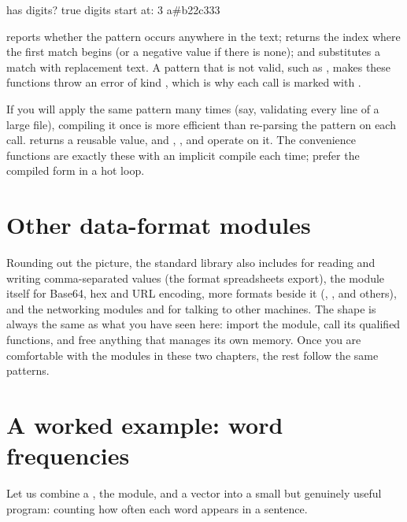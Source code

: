 \begin{progout}
has digits? true
digits start at: 3
a#b22c333
\end{progout}

 reports whether the pattern occurs anywhere in
the text;  returns the index where the first match begins (or a
negative value if there is none); and  substitutes a match
with replacement text. A pattern that is not valid, such as \code{"[0-9"}, makes
these functions throw an error of kind , which is why each call is
marked with .

\begin{deep}
If you will apply the same pattern many times (say, validating every line of a
large file), compiling it once is more efficient than re-parsing the pattern on
each call.  returns a reusable  value, and
, , and
 operate on it. The  convenience
functions are exactly these with an implicit compile each time; prefer the
compiled form in a hot loop.
\end{deep}

\section{Other data-format modules}

Rounding out the picture, the standard library also includes 
for reading and writing comma-separated values (the format spreadsheets export),
the  module itself for Base64, hex and URL encoding, more formats
beside it (, ,  and others), and the networking modules  and
 for talking to other machines. The shape
is always the same as what you have seen here: import the module, call its
qualified functions, and free anything that manages its own memory. Once you are
comfortable with the modules in these two chapters, the rest follow the same
patterns.

\section{A worked example: word frequencies}

Let us combine a , the  module, and a vector into a small
but genuinely useful program: counting how often each word appears in a sentence.

